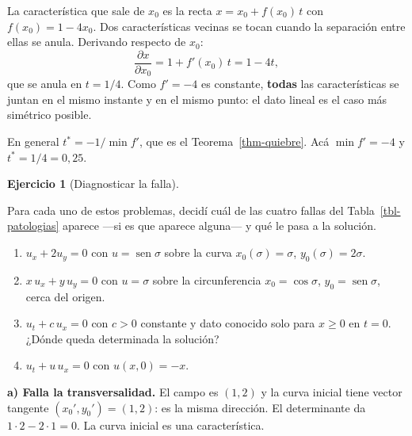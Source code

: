 \documentclass[
  spanish,
  a4paper,
]{scrbook}
\providecommand{\tightlist}{%
  \setlength{\itemsep}{0pt}\setlength{\parskip}{0pt}}
\theoremstyle{definition}
\theoremstyle{plain}
\theoremstyle{definition}
\theoremstyle{plain}
\theoremstyle{definition}
\newtheorem{exercise}{Ejercicio}[chapter]
\theoremstyle{remark}
\begin{document}
La característica que sale de \(x_0\) es la recta
\(x = x_0 + f(x_0)\,t\) con \(f(x_0) = 1-4x_0\). Dos características
vecinas se tocan cuando la separación entre ellas se anula. Derivando
respecto de \(x_0\): \[
\frac{\partial x}{\partial x_0} = 1 + f'(x_0)\,t = 1 - 4t ,
\] que se anula en \(t = 1/4\). Como \(f' = -4\) es constante,
\textbf{todas} las características se juntan en el mismo instante y en
el mismo punto: el dato lineal es el caso más simétrico posible.

En general \(t^{*} = -1/\min f'\), que es el Teorema~\ref{thm-quiebre}.
Acá \(\min f' = -4\) y \(t^{*} = 1/4 = 0{,}25\).

\begin{exercise}[Diagnosticar la
falla]\protect\hypertarget{exr-patologias-diagnostico}{}\label{exr-patologias-diagnostico}

Para cada uno de estos problemas, decidí cuál de las cuatro fallas del
Tabla~\ref{tbl-patologias} aparece ---si es que aparece alguna--- y qué
le pasa a la solución.

\begin{enumerate}
\def\labelenumi{\alph{enumi})}
\tightlist
\item
  \(u_x + 2u_y = 0\) con \(u = \operatorname{sen}\sigma\) sobre la curva
  \(x_0(\sigma)=\sigma\), \(y_0(\sigma)=2\sigma\).
\item
  \(x\,u_x + y\,u_y = 0\) con \(u = \sigma\) sobre la circunferencia
  \(x_0 = \cos\sigma\), \(y_0 = \operatorname{sen}\sigma\), cerca del
  origen.
\item
  \(u_t + c\,u_x = 0\) con \(c>0\) constante y dato conocido solo para
  \(x \ge 0\) en \(t=0\). ¿Dónde queda determinada la solución?
\item
  \(u_t + u\,u_x = 0\) con \(u(x,0) = -x\).
\end{enumerate}

\begin{tcolorbox}[enhanced jigsaw, arc=.35mm, bottomrule=.15mm, bottomtitle=1mm, breakable, colback=white, colbacktitle=quarto-callout-tip-color!10!white, colframe=quarto-callout-tip-color-frame, coltitle=black, left=2mm, leftrule=.75mm, opacityback=0, opacitybacktitle=0.6, rightrule=.15mm, title=\textcolor{quarto-callout-tip-color}{\faLightbulb}\hspace{0.5em}{Solución}, titlerule=0mm, toprule=.15mm, toptitle=1mm]

\textbf{a) Falla la transversalidad.} El campo es \((1,2)\) y la curva
inicial tiene vector tangente \((x_0', y_0') = (1,2)\): es la misma
dirección. El determinante da \(1\cdot 2 - 2\cdot 1 = 0\). La curva
inicial es una característica.


\end{tcolorbox}
\end{exercise}
\end{document}
